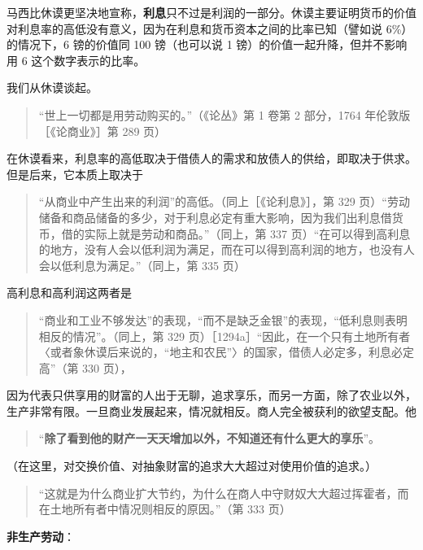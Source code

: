 马西比休谟更坚决地宣称，\textbf{利息}只不过是利润的一部分。休谟主要证明货币的价值对利息率的高低没有意义，因为在利息和货币资本之间的比率已知（譬如说 6\%）的情况下，6 镑的价值同 100 镑（也可以说 1 镑）的价值一起升降，但并不影响用 6 这个数字表示的比率。


我们从休谟谈起。

\begin{quote}“世上一切都是用劳动购买的。”（《论丛》第 1 卷第 2 部分，1764 年伦敦版［《论商业》］第 289 页）\end{quote}

在休谟看来，利息率的高低取决于借债人的需求和放债人的供给，即取决于供求。但是后来，它本质上取决于

\begin{quote}“从商业中产生出来的利润”的高低。（同上［《论利息》］，第 329 页）“劳动储备和商品储备的多少，对于利息必定有重大影响，因为我们出利息借货币，借的实际上就是劳动和商品。”（同上，第 337 页）“在可以得到高利息的地方，没有人会以低利润为满足，而在可以得到高利润的地方，也没有人会以低利息为满足。”（同上，第 335 页）\end{quote}

高利息和高利润这两者是

\begin{quote}“商业和工业不够发达”的表现，“而不是缺乏金银”的表现，“低利息则表明相反的情况”。（同上，第 329 页）［1294a］“因此，在一个只有土地所有者〈或者象休谟后来说的，“地主和农民”〉的国家，借债人必定多，利息必定高”（第 330 页），\end{quote}

因为代表只供享用的财富的人出于无聊，追求享乐，而另一方面，除了农业以外，生产非常有限。一旦商业发展起来，情况就相反。商人完全被获利的欲望支配。他

\begin{quote}“\textbf{除了看到他的财产一天天增加以外，不知道还有什么更大的享乐}”。\end{quote}

（在这里，对交换价值、对抽象财富的追求大大超过对使用价值的追求。）

\begin{quote}“这就是为什么商业扩大节约，为什么在商人中守财奴大大超过挥霍者，而在土地所有者中情况则相反的原因。”（第 333 页）\end{quote}

\fontbox{~\{}\textbf{非生产劳动}：

